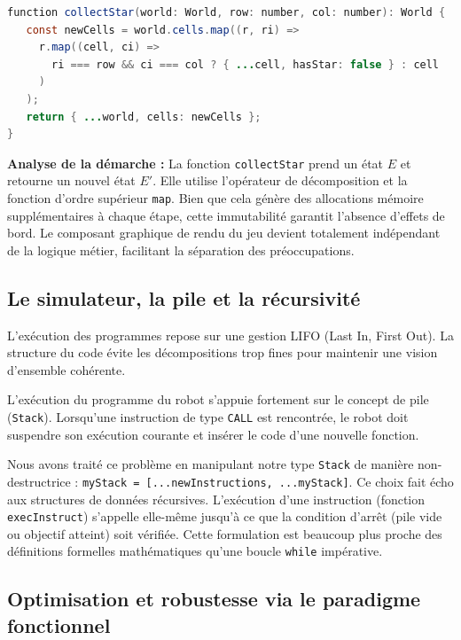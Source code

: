 \documentclass[12pt,a4paper]{article}
\begin{document}
\begin{lstlisting}[language=Java, basicstyle=\ttfamily\small, frame=single, title={Extrait de la logique d'immutabilité}]
function collectStar(world: World, row: number, col: number): World {
   const newCells = world.cells.map((r, ri) =>
     r.map((cell, ci) =>
       ri === row && ci === col ? { ...cell, hasStar: false } : cell
     )
   );
   return { ...world, cells: newCells };
}
\end{lstlisting}

\textbf{Analyse de la démarche :} La fonction \texttt{collectStar} prend un état $E$ et retourne un nouvel état $E'$. 
Elle utilise l'opérateur de décomposition et la fonction d'ordre supérieur \texttt{map}. 
Bien que cela génère des allocations mémoire supplémentaires à chaque étape, cette immutabilité garantit l'absence d'effets de bord. 
Le composant graphique de rendu du jeu devient totalement indépendant de la logique métier, facilitant la séparation des préoccupations.

\subsection{Le simulateur, la pile et la récursivité}

L'exécution des programmes repose sur une gestion LIFO (Last In, First Out). La structure du code évite les décompositions trop fines pour maintenir une vision d'ensemble cohérente.

L'exécution du programme du robot s'appuie fortement sur le concept de pile (\texttt{Stack}). Lorsqu'une instruction de type \texttt{CALL} est rencontrée, 
le robot doit suspendre son exécution courante et insérer le code d'une nouvelle fonction.

Nous avons traité ce problème en manipulant notre type \texttt{Stack} de manière non-destructrice : \texttt{myStack = [...newInstructions, ...myStack]}. 
Ce choix fait écho aux structures de données récursives. L'exécution d'une instruction (fonction \texttt{execInstruct}) s'appelle elle-même jusqu'à ce que la condition d'arrêt (pile vide ou objectif atteint) soit vérifiée. 
Cette formulation est beaucoup plus proche des définitions formelles mathématiques qu'une boucle \texttt{while} impérative.

\subsection{Optimisation et robustesse via le paradigme fonctionnel}
\end{document}

